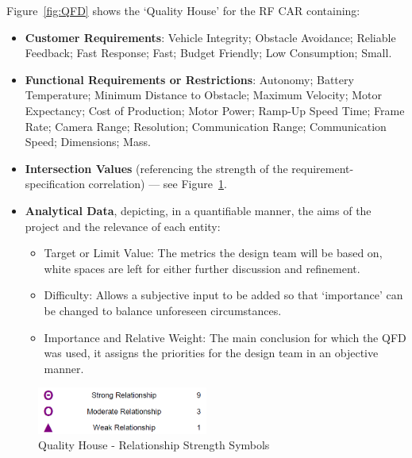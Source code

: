 Figure~\ref{fig:QFD} shows the `Quality House' for the RF CAR containing:
\begin{itemize}
\item \textbf{Customer Requirements}: Vehicle Integrity; Obstacle Avoidance; Reliable Feedback; Fast Response; Fast; Budget Friendly; Low Consumption; Small.
\item \textbf{Functional Requirements or Restrictions}: Autonomy; Battery Temperature; Minimum Distance to Obstacle; Maximum Velocity; Motor Expectancy; Cost of Production; Motor Power; Ramp-Up Speed Time; Frame Rate; Camera Range; Resolution; Communication Range; Communication Speed; Dimensions; Mass.
\item \textbf{Intersection Values} (referencing the strength of the requirement-specification correlation) --- see Figure~\ref{fig:QFD-R}.
\item \textbf{Analytical Data}, depicting, in a quantifiable manner, the aims of the project and the relevance of each
  entity:
  \begin{itemize}
  \item Target or Limit Value: The metrics the design team will be based on, white spaces are left for either further discussion and refinement.
  \item Difficulty: Allows a subjective input to be added so that `importance' can be changed to balance unforeseen circumstances.
  \item Importance and Relative Weight: The main conclusion for which the QFD was used, it assigns the priorities for the design team in an objective manner.
  \end{itemize}
\end{itemize}
%
\begin{figure}[!htbp]
   \centering
       \includegraphics[page=1,width=0.5\textwidth]{sec/img/Relationship_Symbols.png} 
 \caption{Quality House - Relationship Strength Symbols}%
\label{fig:QFD-R}
\end{figure}
%
